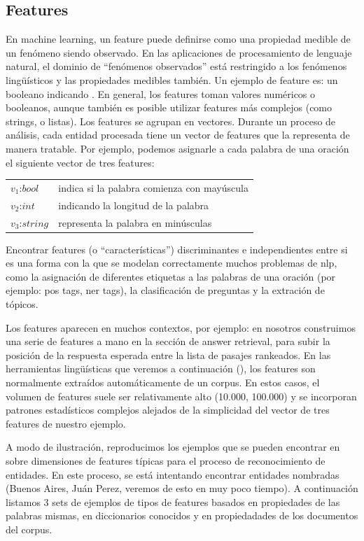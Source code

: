 \subsection*{Features}
En machine learning, un feature puede definirse como una propiedad medible de un fenómeno siendo observado. En las aplicaciones de procesamiento de lenguaje natural, el dominio de “fenómenos observados” está restringido a los fenómenos lingüísticos y las propiedades medibles también. Un ejemplo de feature es: un booleano indicando . En general, los features toman valores numéricos o booleanos, aunque también es posible utilizar features más complejos (como strings, o listas). Los features se agrupan en vectores. Durante un proceso de análisis, cada entidad procesada tiene un vector de features que la representa de manera tratable. Por ejemplo, podemos asignarle a cada palabra de una oración el siguiente vector de tres features:

\begin{center}
\begin{tabular}{ll}
$v_1$:$bool$ & indica si la palabra comienza con mayúscula \\
$v_2$:$int$ & indicando la longitud de la palabra \\
$v_3$:$string$ & representa la palabra en minúsculas \\
\end{tabular}
\end{center}


Encontrar features (o “características”) discriminantes e independientes entre si es una forma con la que se modelan correctamente muchos problemas de nlp, como la asignación de diferentes etiquetas a las palabras de una oración (por ejemplo: pos tags, ner tags), la clasificación de preguntas y la extración de tópicos. 

Los features aparecen en muchos contextos, por ejemplo: en  nosotros construimos una serie de features a mano en la sección de answer retrieval, para subir la posición de la respuesta esperada entre la lista de pasajes rankeados. En las herramientas lingüísticas que veremos a continuación (), los features son normalmente extraídos automáticamente de un corpus. En estos casos, el volumen de features suele ser relativamente alto (10.000, 100.000) y se incorporan patrones estadísticos complejos alejados de la simplicidad del vector de tres features de nuestro ejemplo. 

A modo de ilustración, reproducimos los ejemplos que se pueden encontrar en \\ \cite{NER1} sobre dimensiones de features típicas para el proceso de reconocimiento de entidades.
En este proceso, se está intentando encontrar entidades nombradas (Buenos Aires, Juán Perez, veremos de esto en muy poco tiempo). A continuación listamos 3 sets de ejemplos de tipos de features basados en propiedades de las palabras mismas, en diccionarios conocidos y en propiedadades de los documentos del corpus.

